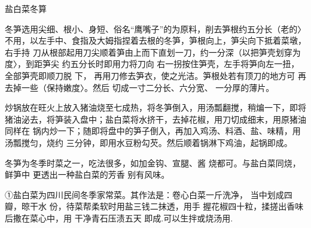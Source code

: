 \begin{recipe}{盐白菜冬算}

\ingredients


\cooking

\step 冬笋选用尖细、根小、身短、俗名“鹰嘴子”的为原料，削去笋根约五分长（老的〉
不用，以左手中、食指及大姆指捏着去根的冬笋，笋根向上，笋尖向下抵着菜墩，右手持
刀从根部起用刀尖顺着笋由上而下直划一刀，约一分深（以把笋壳划穿为度〉，到距笋尖
约五分长时即用力将刀向 右一拐按住笋壳，左手将笋向左一扭，全部笋壳即顺刀脱 下，
再用刀修去笋衣，使之光洁。笋根处若有顶刀的地方可 再去掉一些（保持嫩度〉。然后
切成一寸二分长、六分宽、 一分厚的薄片。

\step 炒锅放在旺火上放入猪油烧至七成热，将冬笋倒入，用汤瓢翻搅，稍煸一下，即将
猪油泌去，将笋装入盘中；盐白菜将水挤干，去掉花椒，用刀切成细末，用原猪油同样在
锅内炒一下；随即将盘中的笋子倒入，再加入鸡汤、料酒、盐、味精，用汤瓢搅匀，烧约
三分钟，即用水豆粉勾芡。然后顺着锅淋下鸡油，起锅即成。

\notes

冬笋为冬季时菜之一，吃法很多，如加金钩、宣腿、酱 烧都可。与盐白菜同烧，鲜笋中
更透出一种盐白菜的芳香 别有风味。

①盐白菜为四川民间冬季家常菜。其作法是：卷心白菜一斤洗净， 当中划成四瓣，晾干水
份，待菜帮柔软时用盐三钱二抹透，用手 握花椒四十粒，揉搓出香味后撒在菜心中，用
干净青石压渍五天 即成.可以生拌或烧汤用.

\end{recipe}


